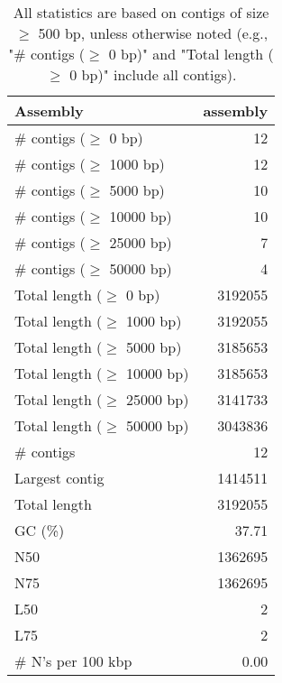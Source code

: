 \documentclass[12pt,a4paper]{article}
\begin{document}
\begin{table}[ht]
\begin{center}
\caption{All statistics are based on contigs of size $\geq$ 500 bp, unless otherwise noted (e.g., "\# contigs ($\geq$ 0 bp)" and "Total length ($\geq$ 0 bp)" include all contigs).}
\begin{tabular}{|l*{1}{|r}|}
\hline
Assembly & assembly \\ \hline
\# contigs ($\geq$ 0 bp) & 12 \\ \hline
\# contigs ($\geq$ 1000 bp) & 12 \\ \hline
\# contigs ($\geq$ 5000 bp) & 10 \\ \hline
\# contigs ($\geq$ 10000 bp) & 10 \\ \hline
\# contigs ($\geq$ 25000 bp) & 7 \\ \hline
\# contigs ($\geq$ 50000 bp) & 4 \\ \hline
Total length ($\geq$ 0 bp) & 3192055 \\ \hline
Total length ($\geq$ 1000 bp) & 3192055 \\ \hline
Total length ($\geq$ 5000 bp) & 3185653 \\ \hline
Total length ($\geq$ 10000 bp) & 3185653 \\ \hline
Total length ($\geq$ 25000 bp) & 3141733 \\ \hline
Total length ($\geq$ 50000 bp) & 3043836 \\ \hline
\# contigs & 12 \\ \hline
Largest contig & 1414511 \\ \hline
Total length & 3192055 \\ \hline
GC (\%) & 37.71 \\ \hline
N50 & 1362695 \\ \hline
N75 & 1362695 \\ \hline
L50 & 2 \\ \hline
L75 & 2 \\ \hline
\# N's per 100 kbp & 0.00 \\ \hline
\end{tabular}
\end{center}
\end{table}
\end{document}
